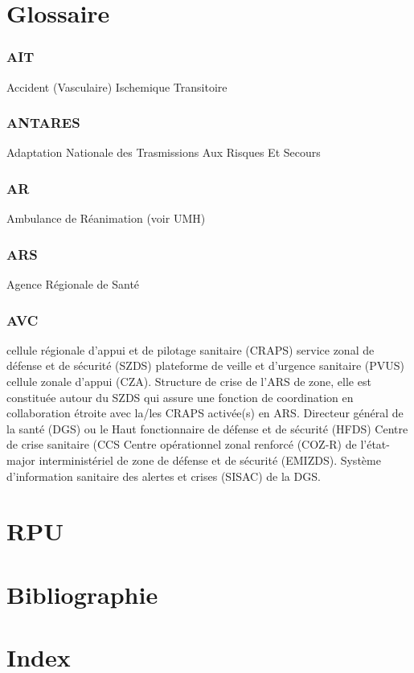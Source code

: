 \documentclass[12pt,english,french]{report}\usepackage{graphicx, color}
\begin{document}
\chapter{Glossaire}





\subsection*{AIT}
Accident (Vasculaire) Ischemique Transitoire

\subsection*{ANTARES}
Adaptation Nationale des Trasmissions Aux Risques Et Secours

\subsection*{AR}
Ambulance de Réanimation (voir UMH)

\subsection*{ARS}
Agence Régionale de Santé

\subsection*{AVC}

cellule régionale d’appui et de pilotage sanitaire (CRAPS)
service zonal de défense et de sécurité (SZDS)
plateforme de veille et d’urgence sanitaire (PVUS)
cellule zonale d’appui (CZA). Structure de crise de l’ARS de zone, elle est constituée autour du SZDS qui assure une fonction de coordination en collaboration étroite avec la/les CRAPS activée(s) en ARS.
Directeur général de la santé (DGS) ou le Haut fonctionnaire de défense et de sécurité (HFDS)
Centre de crise sanitaire (CCS
Centre opérationnel zonal renforcé (COZ-R) de l’état-major interministériel de zone de défense et de sécurité (EMIZDS).
Système d’information sanitaire des alertes et crises (SISAC) de la DGS.




\chapter{RPU}
\chapter{Bibliographie}

\chapter{Index}
\printindex
\end{document}
